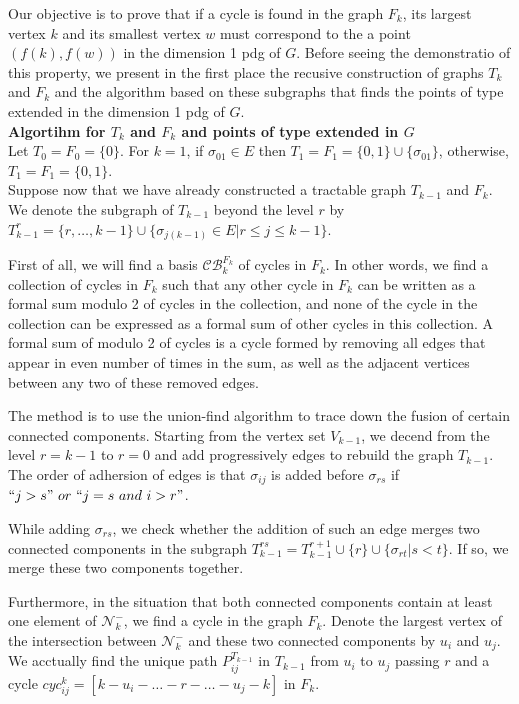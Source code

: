 \documentclass[a4paper,12pt]{article}
\numberwithin{equation}{section}
\begin{document}
	Our objective is to prove that if a cycle is found in the graph $F_k$, its largest vertex $k$ and its smallest vertex $w$ must correspond to the a point $(f(k), f(w))$ in the dimension 1 pdg of $G$. Before seeing the demonstratio of this property, we present in the first place the recusive construction of graphs $T_k$ and $F_{k}$ and the algorithm based on these subgraphs that finds the points of type extended in the dimension 1 pdg of $G$.\\
	
	
	\newpage
	\noindent \textbf{Algortihm for $T_k$ and $F_k$ and points of type extended in $G$}\\
	
	Let $T_0 = F_0 = \{0\}$. For $k=1$, if $\sigma_{01} \in E$ then $T_1 = F_1 = \{0,1\} \cup \{\sigma_{01} \}$, otherwise, $T_1 = F_1 = \{0,1\}$.\\
	
	Suppose now that we have already constructed a tractable graph $T_{k-1}$ and $F_k$. We denote the subgraph of $T_{k-1}$ beyond the level $r$ by $T^r_{k-1} = \{r,\ldots,k-1\} \cup \{ \sigma_{j(k-1)} \in E \vert r \leq j \leq k-1 \}$.
	
	First of all, we will find a basis $\mathcal{CB}^{F_k}_k$ of cycles in $F_k$. In other words, we find a collection of cycles in $F_k$ such that any other cycle in $F_k$ can be written as a formal sum modulo 2 of cycles in the collection, and none of the cycle in the collection can be expressed as a formal sum of other cycles in this collection. A formal sum of modulo 2 of cycles is a cycle formed by removing all edges that appear in even number of times in the sum, as well as the adjacent vertices between any two of these removed edges. 
	
	The method is to use the union-find algorithm to trace down the fusion of certain connected components. Starting from the vertex set $V_{k-1}$, we decend from the level $r = k-1$ to $r = 0$ and add progressively edges to rebuild the graph $T_{k-1}$. The order of adhersion of edges is that $\sigma_{ij}$ is added before $\sigma_{rs}$ if $``j > s" \  or \  ``j=s \  and \  i > r"$.
	
	While adding $\sigma_{rs}$, we check whether the addition of such an edge merges two connected components in the subgraph $T^{rs}_{k-1} = T^{r+1}_{k-1} \cup \{r\} \cup \{ \sigma_{rt} \vert s < t\}$. If so, we merge these two components together. 
	
	Furthermore, in the situation that both connected components contain at least one element of $\mathcal{N}_k^-$, we find a cycle in the graph $F_k$. Denote the largest vertex of the intersection between $\mathcal{N}_k^-$ and these two connected components by $u_i$ and $u_j$. We acctually find the unique path $P_{ij}^{T_{k-1}}$ in $T_{k-1}$ from $u_i$ to $u_j$ passing $r$ and a cycle $cyc^{k}_{ij} = [k - u_i -\ldots -r - \ldots - u_j - k]$ in $F_k$. 
	
\end{document}
